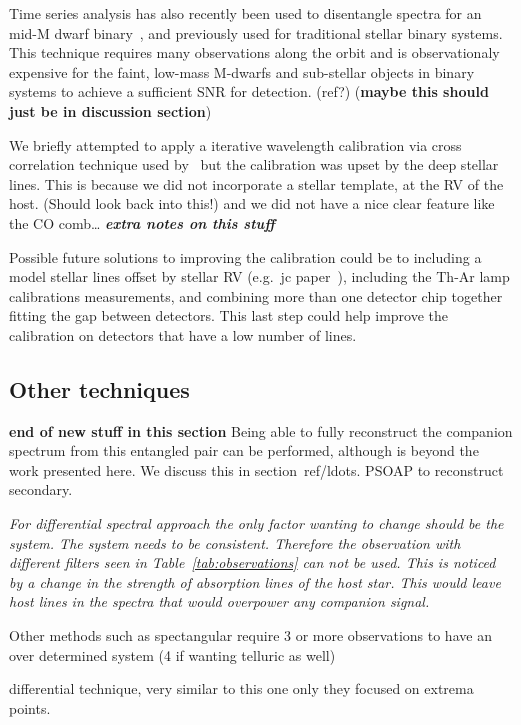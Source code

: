 Time series analysis has also recently been used to disentangle spectra for an mid-M dwarf binary~\citep{czekala_disentangling_2017}, and previously used for traditional stellar binary systems. This technique requires many observations along the orbit and is observationaly expensive for the faint, low-mass M-dwarfs and sub-stellar objects in binary systems to achieve a sufficient SNR for detection. (ref?) (\textbf{maybe this should just be in discussion section})



We briefly attempted to apply a iterative wavelength calibration via cross correlation technique used by~\citet{brogi_rotation_2016} but the calibration was upset by the deep stellar lines. This is because we did not incorporate a stellar template, at the RV of the host. (Should look back into this!) and we did not have a nice clear feature like the CO comb\ldots
\textbf{\emph{extra notes on this stuff}}

Possible future solutions to improving the calibration could be to including a model stellar lines offset by stellar RV (e.g.\ jc paper~\citep{piskorz_evidence_2016}), including the Th-Ar lamp calibrations measurements, and combining more than one detector chip together fitting the gap between detectors. This last step could help improve the calibration on detectors that have a low number of lines.




\subsection{Other techniques}

\textbf{end of new stuff in this section}
Being able to fully reconstruct the companion spectrum from this entangled pair can be performed, although is beyond the work presented here. We discuss this in section~ref{}/ldots. PSOAP to reconstruct secondary.

\emph{
For differential spectral approach the only factor wanting to change should be the system. The system needs to be consistent. Therefore the observation with different filters seen in Table~\ref{tab:observations} can not be used. This is noticed by a change in the strength of absorption lines of the host star. This would leave host lines in the spectra that would overpower any companion signal.}

Other methods such as spectangular require 3 or more observations to have an over determined system (4 if wanting telluric as well)


\citep{kostogryz_spectral_2013} differential technique, very similar to this one only they focused on extrema points.

